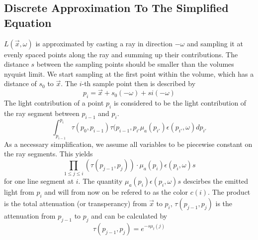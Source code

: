 \subsection{Discrete Approximation To The Simplified Equation}
$L(\vec{x},\omega )$ is approximated by casting a ray in direction $-\omega$ and sampling it at evenly spaced points along the ray and summing up their contributions. The distance $s$ between the sampling points should be smaller than the volumes nyquist limit.
We start sampling at the first point within the volume, which has a distance of $s_0$ to $\vec{x}$. The $i$-th sample point then is described by
\begin{equation}
p_i=\vec{x} + s_0(-\omega) + si(-\omega)
\end{equation}
The light contribution of a point $p_i$ is considered to be the light contribution of the ray segment between $p_{i-1}$ and $p_i$.
\begin{equation}
\int_{p_{i-1}}^{p_i} \tau (p_0,p_{i-1}) \tau(p_{i-1},p_{i'} \mu_a(p_{i'})\epsilon (p_{i'}, \omega)dp_{i'}
\end{equation} 
As a necessary simplification, we assume all variables to be piecewise constant on the ray segments. This yields
\begin{equation}
{\prod_{1\le j \le i}{(\tau(p_{j-1}, p_j))} \cdot \mu_a(p_{i})\epsilon (p_{i}, \omega)s}
\end{equation} 
for one line segment at $i$.
The quantity $\mu_a(p_{i})\epsilon (p_{i}, \omega)s$ descirbes the emitted light from $p_i$ and will from now on be refered to as the color $c(i)$. The product is the total attenuation (or transperancy) from $\vec{x}$ to $p_i$, $\tau(p_{j-1}, p_j)$ is the attenuation from $p_{j-1}$ to $p_j$ and can be calculated by
\begin{equation}
\tau(p_{j-1}, p_j) = e^{-s\mu_t(j)}
\end{equation}
